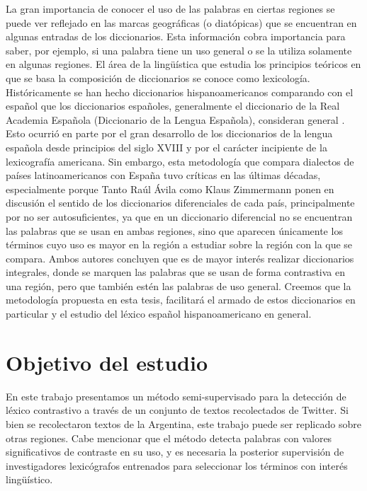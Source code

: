 La gran importancia de conocer el uso de las palabras en ciertas regiones se puede ver reflejado en las marcas geográficas (o diatópicas) que se encuentran en algunas entradas de los diccionarios. Esta información cobra importancia para saber, por ejemplo, si una palabra tiene un uso general o se la utiliza solamente en algunas regiones. El área de la lingüística que estudia los principios teóricos en que se basa la composición de diccionarios se conoce como lexicología. Históricamente se han hecho diccionarios hispanoamericanos comparando con el español que los diccionarios españoles, generalmente el diccionario de la Real Academia Española (Diccionario de la Lengua Española), consideran general \cite {zimmermann2006fin}. Esto ocurrió en parte por el gran desarrollo de los diccionarios de la lengua española desde principios del siglo XVIII y por el carácter incipiente de la lexicografía americana. Sin embargo, esta metodología que compara dialectos de países latinoamericanos con España tuvo críticas en las últimas décadas, especialmente porque  Tanto Raúl Ávila como Klaus Zimmermann ponen en discusión el sentido de los diccionarios diferenciales de cada país, principalmente por no ser autosuficientes, ya que en un diccionario diferencial no se encuentran las palabras que se usan en ambas regiones, sino que aparecen únicamente los términos cuyo uso es mayor en la región a estudiar sobre la región con la que se compara. Ambos autores concluyen que es de mayor interés realizar diccionarios integrales, donde se marquen las palabras que se usan de forma contrastiva en una región, pero que también estén las palabras de uso general. Creemos que la metodología propuesta en esta tesis, facilitará el armado de estos diccionarios en particular y el estudio del léxico español hispanoamericano en general.

\section{Objetivo del estudio}

En este trabajo presentamos un método semi-supervisado para la detección de léxico contrastivo a través de un conjunto de textos recolectados de Twitter. Si bien se recolectaron textos de la Argentina, este trabajo puede ser replicado sobre otras regiones. Cabe mencionar que el método detecta palabras con valores significativos de contraste en su uso, y es necesaria la posterior supervisión de investigadores lexicógrafos entrenados para seleccionar los términos con interés lingüístico.

